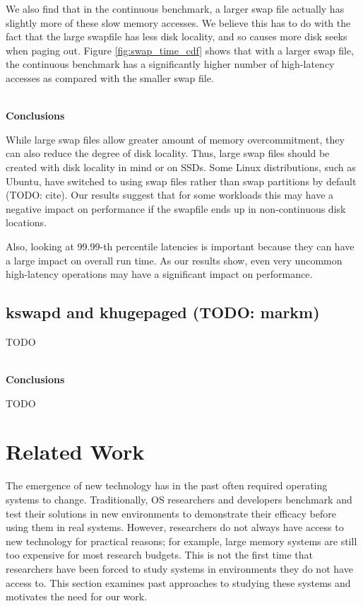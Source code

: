 \documentclass[twocolumn,11pt]{article}
\begin{document}
We also find that in the continuous benchmark, a larger swap file actually has
slightly more of these slow memory accesses. We believe this has to do with the
fact that the large swapfile has less disk locality, and so causes more disk
seeks when paging out. Figure \ref{fig:swap_time_cdf} shows that with a larger
swap file, the continuous benchmark has a significantly higher number of
high-latency accesses as compared with the smaller swap file.

~\\ \textbf{Conclusions} 

While large swap files allow greater amount of memory overcommitment, they can
also reduce the degree of disk locality. Thus, large swap files should be
created with disk locality in mind or on SSDs. Some Linux distributions, such as
Ubuntu, have switched to using swap files rather than swap partitions by default
(TODO: cite). Our results suggest that for some workloads this may have a
negative impact on performance if the swapfile ends up in non-continuous disk
locations.

Also, looking at 99.99-th percentile latencies is important because they can
have a large impact on overall run time. As our results show, even very uncommon
high-latency operations may have a significant impact on performance.

\subsection{kswapd and khugepaged (TODO: markm)}

TODO

~\\ \textbf{Conclusions} 

TODO


\section{Related Work}

The emergence of new technology has in the past often required operating systems
to change. Traditionally, OS researchers and developers benchmark and test their
solutions in new environments to demonstrate their efficacy before using them in
real systems. However, researchers do not always have access to new technology
for practical reasons; for example, large memory systems are still too expensive
for most research budgets. This is not the first time that researchers have been
forced to study systems in environments they do not have access to. This section
examines past approaches to studying these systems and motivates the need for
our work.
\end{document}
